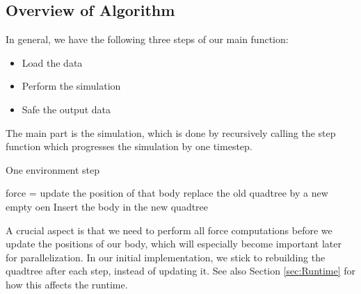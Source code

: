 \documentclass[a4paper]{scrartcl}
\begin{document}
    \subsection{Overview of Algorithm}
        In general, we have the following three steps of our main function:
        \begin{itemize}
            \item Load the data
            \item Perform the simulation
            \item Safe the output data
        \end{itemize}
        The main part is the simulation, which is done by recursively calling
        the step function which progresses the simulation by one timestep.
        \begin{algorithm}[H]
            \caption{One environment step}\label{alg:step}
            \begin{algorithmic}[1]
            \State force = 
            \EndFor
            \State update the position of that body
            \EndFor
            \State replace the old quadtree by a new empty oen
            \State Insert the body in the new quadtree
            \EndFor
            \EndProcedure
            \end{algorithmic}
        \end{algorithm}
        A crucial aspect is that we need to perform all force computations
        before we update the positions of our body, which will especially become
        important later for parallelization. In our initial implementation, we
        stick to rebuilding the quadtree after each step, instead of updating
        it. See also Section \ref{sec:Runtime} for how this affects the runtime.
        
\end{document}
